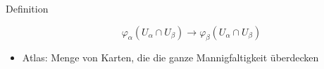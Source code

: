 \begin{frame}[t]
\begin{columns}[t,onlytextwidth]
\begin{column}{0.48\textwidth}
\begin{block}{Definition}
\begin{itemize}
\[\varphi_\alpha(U_\alpha\cap U_\beta)
\to
\varphi_\beta(U_\alpha\cap U_\beta)
\]
\item<4-> Atlas: Menge von Karten, die die ganze Mannigfaltigkeit überdecken
\end{itemize}
\end{block}
\vspace{-7pt}
\vspace{-3pt}
\end{column}
\end{columns}
\end{frame}
\egroup
